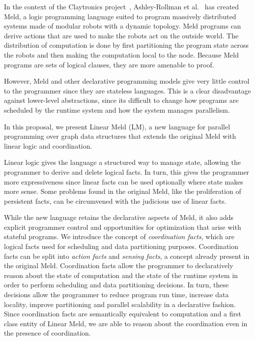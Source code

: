 In the context of the Claytronics project~\cite{goldstein-computer05},
Ashley-Rollman et al.~\cite{ashley-rollman-iclp09,
ashley-rollman-derosa-iros07wksp} has created Meld, a logic programming
language suited to program massively distributed systems made of modular
robots with a dynamic topology.  Meld programs can derive actions that are
used to make the robots act on the outside world. The distribution of
computation is done by first partitioning the program state across the
robots and then making the computation local to the node. Because Meld
programs are sets of logical clauses, they are more amenable to proof.

However, Meld and other declarative programming models give very little control
to the programmer since they are stateless languages.  This is a clear
disadvantage against lower-level abstractions, since its difficult to change how
programs are scheduled by the runtime system and how the system manages
parallelism.

In this proposal, we present Linear Meld (LM), a new language for parallel
programming over graph data structures that extends the original Meld with
linear logic and coordination.

Linear logic gives the language a structured way to manage state, allowing the
programmer to derive and delete logical facts. In turn, this gives the
programmer more expressiveness since linear facts can be used optionally where
state makes more sense. Some problems found in the original Meld, like the
proliferation of persistent facts, can be circumvened with the judicious use of
linear facts.

While the new language retains the declarative aspects of Meld, it also adds
explicit programmer control and opportunities for optimization that arise with
stateful programs.  We introduce the concept of \emph{coordination facts}, which
are logical facts used for scheduling and data partitioning purposes.
Coordination facts can be split into \emph{action facts} and \emph{sensing
facts}, a concept already present in the original Meld. Coordination facts
allow the programmer to declaratively reason about the state of computation
and the state of the runtime system in order to perform scheduling and data
partitioning decisions. In turn, these decisions allow the programmer to
reduce program run time, increase data locality, improve partitioning and
parallel scalability in a declarative fashion. Since coordination facts are
semantically equivalent to computation and a first class entity of Linear
Meld, we are able to reason about the coordination even in the presence of
coordination.


